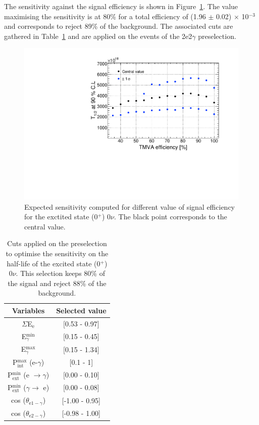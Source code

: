 \documentclass[main.tex]{subfiles}
\begin{document}
\bigskip


\NI The sensitivity against the signal efficiency is shown in Figure~\ref{plot:SensVsEffbb0nu0_250}. The value maximising the sensitivity is at 80\% for a total efficiency of (1.96 $\pm$ 0.02) $\times$ 10$^{-\text{3}}$ and corresponds to reject 89\% of the background. The associated cuts are gathered in Table~\ref{tab:Cuts0nu0Plus250keV} and are applied on the events of the 2e2$\gamma$ preselection.


\begin{figure} [h!]
\begin{center}
\includegraphics[scale=0.55]{pictures/FinalResults/bb0nu0/SensVsEff_bb0nu0_250_v2.pdf}
\end{center}
\caption{Expected sensitivity computed for different value of signal efficiency for the exctited state (0$^+$) 0$\nu$. The black point corresponds to the central value.}
\label{plot:SensVsEffbb0nu0_250}
\end{figure}



\begin{table}[h!]
\centering
\begin{tabular}{c|c}
Variables & Selected value \\
\toprule
$\Sigma$E$_{\text{e}}$ & [0.53 - 0.97] \\
E$_{\gamma}^{\text{min}}$    & [0.15 - 0.45] \\
E$_{\gamma}^{\text{max}}$    & [0.15 - 1.34] \\
P$_{\text{int}}^{\text{max}}$ (e-$\gamma$) & [0.1 - 1] \\
P$_{\text{ext}}^{\text{min}}$ (e $\rightarrow \gamma$) & [0.00 - 0.10] \\
P$_{\text{ext}}^{\text{min}}$ ($\gamma \rightarrow$ e) & [0.00 - 0.08] \\
cos ($\theta_{\text{e1}-\gamma}$) & [-1.00 - 0.95] \\
cos ($\theta_{\text{e2}-\gamma}$) & [-0.98 - 1.00] \\
\bottomrule
\end{tabular}
\caption{Cuts applied on the preselection to optimise the sensitivity on the half-life of the excited state (0$^+$) 0$\nu$. This selection keeps 80\% of the signal and reject 88\% of the background.}
\label{tab:Cuts0nu0Plus250keV}
\end{table}
\end{document}
